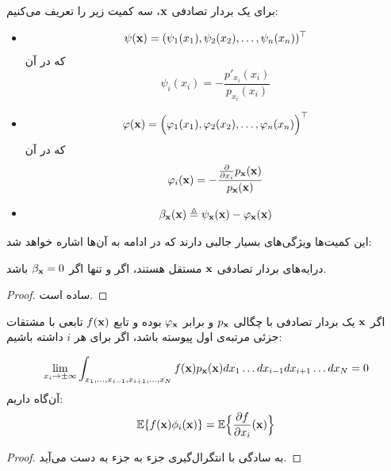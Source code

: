 \newpage
\begin{definition}
	برای یک بردار تصادفی 
$\mathbf{x}$، 
سه کمیت زیر را تعریف می‌کنیم:
\begin{itemize}
\item
\textbf{}
\begin{equation}
\mathbf{\psi}(\mathbf{x}) = (\psi_1(x_1), \psi_2(x_2),\dots, \psi_n(x_n))^\top
\end{equation}
که در آن
\begin{equation}
\psi_i(x_i) = - \frac{p'_{x_i}(x_i)}{p_{x_i}(x_i)}
\end{equation}
\item 
\textbf{}
\begin{equation}
\mathbf{\varphi}(\mathbf{x}) = \Big(\varphi_1(x_1), \varphi_2(x_2),\dots, \varphi_n(x_n)\Big)^\top
\end{equation}
که در آن
\begin{equation}
\varphi_i(\mathbf{x}) = -\frac{\frac{\partial}{\partial x_i}p_{\mathbf{x}}(\mathbf{x})}{p_{\mathbf{x}}(\mathbf{x})}
\end{equation}

\item
\textbf{ }	
\begin{equation}
\mathbf{\beta}_{\mathbf{x}} (\mathbf{x}) \triangleq \mathbf{\psi}_{\mathbf{x}}(\mathbf{x}) - \varphi_{\mathbf{x}}(\mathbf{x})
\end{equation}

\end{itemize}
\end{definition}

این کمیت‌ها ویژگی‌های بسیار جالبی دارند که در ادامه به آن‌ها اشاره خواهد شد:
\begin{theorem}
درایه‌‌های بردار تصادفی 
$\mathbf{x}$
مستقل هستند، اگر و تنها اگر 
$\mathbf{\beta}_{\mathbf{x}} = 0$
باشد.
\end{theorem}
\begin{proof}
	ساده است.
\end{proof}	

\begin{theorem}
اگر 
$\mathbf{x}$
یک بردار تصادفی با چگالی 
$p_{\mathbf{x}}$
و 
برابر 
$\mathbf{\varphi_{\mathbf{x}}}$
بوده و تابع
$f(\mathbf{x})$
تابعی با مشتقات جزئی مرتبه‌ی اول پیوسته باشد، اگر برای هر 
$i$
داشته باشیم:

\begin{equation}
\lim_{x_i \to \pm\infty} \int_{x_1, \dots, x_{i-1}, x_{i+1}, \dots, x_N} f(\mathbf{x})p_{\mathbf{x}}(\mathbf{x}) dx_1 \dots dx_{i-1}dx_{i+1}\dots dx_N = 0
\end{equation}
آن‌گاه داریم:
\begin{equation}
\mathbb{E}\{f(\mathbf{x})\phi_i(\mathbf{x})\} = \mathbb{E}\Big\{\frac{\partial f}{\partial x_i}(\mathbf{x})\Big\}
\end{equation}
\end{theorem}
\begin{proof}
	به سادگی با انتگرال‌گیری جزء به جزء به دست می‌آید.
\end{proof}

